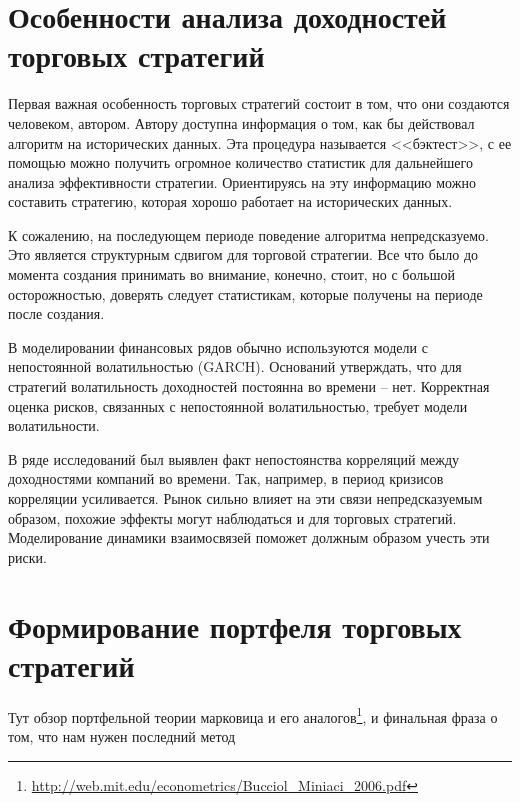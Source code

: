 \section{Особенности анализа доходностей торговых стратегий}
Первая важная особенность торговых стратегий состоит в том, что они создаются человеком, автором. Автору доступна информация о том, как бы действовал алгоритм на исторических данных. Эта процедура называется <<бэктест>>, с ее помощью можно получить огромное количество статистик для дальнейшего анализа эффективности стратегии. Ориентируясь на эту информацию можно составить стратегию, которая хорошо работает на исторических данных. 

К сожалению, на последующем периоде поведение алгоритма непредсказуемо. Это является структурным сдвигом для торговой стратегии. Все что было до момента создания принимать во внимание, конечно, стоит, но с большой осторожностью, доверять следует статистикам, которые получены на периоде после создания.
 
В моделировании финансовых рядов обычно используются модели с непостоянной волатильностью (GARCH). Оснований утверждать, что для стратегий волатильность доходностей постоянна во времени -- нет. Корректная оценка рисков, связанных с непостоянной волатильностью, требует модели волатильности.

В ряде исследований был выявлен факт непостоянства корреляций между доходностями компаний во времени. Так, например, в период кризисов корреляции усиливается. Рынок сильно влияет на эти связи непредсказуемым образом, похожие эффекты могут наблюдаться и для торговых стратегий. Моделирование динамики взаимосвязей поможет должным образом учесть эти риски.
\section{Формирование портфеля торговых стратегий}
Тут обзор портфельной теории марковица и его аналогов\footnote{\href{http://web.mit.edu/econometrics/Bucciol\_Miniaci\_2006.pdf}{http://web.mit.edu/econometrics/Bucciol\_Miniaci\_2006.pdf}}, и финальная фраза о том, что нам нужен последний метод

